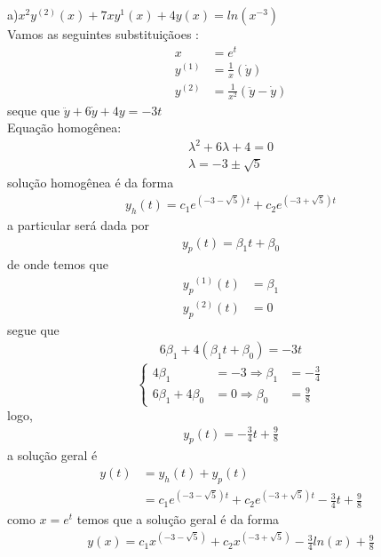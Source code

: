 \documentclass[a4paper,12pt]{article}
\begin{document}
a)$x^{2}y^{(2)}(x) + 7xy^{1}(x) + 4y(x) = ln(x^{-3})$\\
Vamos as seguintes substitui\c c\~aoes :
\begin{align*}
	x &= e^{t} \\
	y^{(1)} &= \frac{1}{x} (\dot y) \\
	y^{(2)} &= \frac{1}{x^{2}} (\ddot y - \dot y)
\end{align*}
seque que 
$\ddot y + 6 \dot y + 4y= -3t$ \\
Equa\c c\~ao homog\^enea:\\
\begin{align*}
{\lambda}^{2} +6{\lambda} + 4 = 0\\
{\lambda} = -3 \pm \sqrt{5}
\end{align*}
solu\c c\~ao homog\^enea \'e da forma 
\begin{align*}
	y_h(t) = c_1 e^{(-3 -\sqrt{5})t} + c_2 e^{(-3 +\sqrt{5})t} 
\end{align*}
a particular ser\'a dada por
\begin{align*}
	y_p(t) = {\beta}_1 t + {\beta}_0 
\end{align*}
de onde temos que 
\begin{align*}
	{y_p}^{(1)}(t) &= {\beta}_1 \\
	{y_p}^{(2)}(t) &= 0 
\end{align*}
segue que
\begin{align*}
	6{\beta}_1 + 4({\beta}_1 t+ {\beta}_0) = -3t 
\end{align*}
\[\left \{ 
	\begin{array}{cll}
		4{\beta}_1 &= -3 \Rightarrow {\beta}_1 &=- \frac{3}{4}\\
		6{\beta}_1 + 4{\beta}_0 &= 0 \Rightarrow {\beta}_0 &=\frac{9}{8} 
	\end{array}
\right .
\]
logo, 
\begin{align*}
	y_p(t) = - \frac{3}{4}t + \frac{9}{8}
\end{align*}
a solu\c c\~ao geral \'e 
\begin{align*}
	y(t) &= y_h(t) + y_p(t) \\
	&=  c_1 e^{(-3 -\sqrt{5})t} + c_2 e^{(-3 +\sqrt{5})t} - \frac{3}{4}t + \frac{9}{8}
\end{align*}
como $x = e^{t}$ temos que a solu\c c\~ao geral \'e da forma 
\begin{align*}
	y(x) = c_1 x^{(-3 -\sqrt{5})} + c_2 x^{(-3 +\sqrt{5})}  - \frac{3}{4} ln(x) + \frac{9}{8}
\end{align*}
\end{document}
